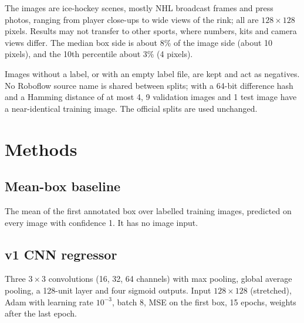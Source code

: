 \documentclass[10pt,a4paper]{article}
\begin{document}
The images are ice-hockey scenes, mostly NHL broadcast frames and press photos, ranging from
player close-ups to wide views of the rink; all are $128\times128$ pixels. Results may not
transfer to other sports, where numbers, kits and camera views differ. The median box side is
about 8\% of the image side (about 10 pixels), and the 10th percentile about 3\% (4 pixels).

Images without a label, or with an empty label file, are kept and act as negatives. No Roboflow
source name is shared between splits; with a 64-bit difference hash and a Hamming distance of at
most 4, 9 validation images and 1 test image have a near-identical training image. The official
splits are used unchanged.

\section{Methods}

\subsection{Mean-box baseline}
The mean of the first annotated box over labelled training images, predicted on every image with
confidence 1. It has no image input.

\subsection{v1 CNN regressor}
Three $3\times3$ convolutions (16, 32, 64 channels) with max pooling, global average pooling, a
128-unit layer and four sigmoid outputs. Input $128\times128$ (stretched), Adam with learning rate
$10^{-3}$, batch 8, MSE on the first box, 15 epochs, weights after the last epoch.
\end{document}
